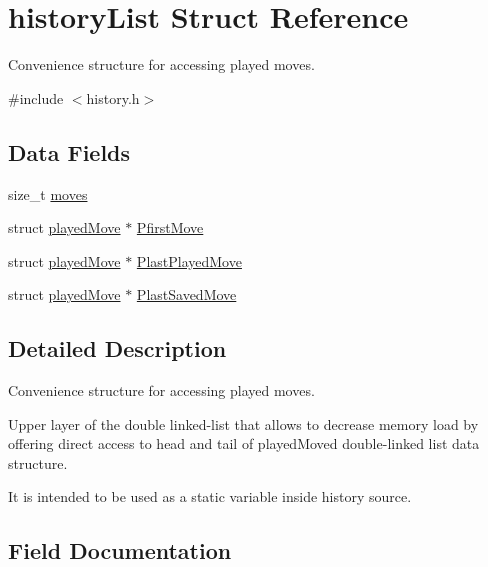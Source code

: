 \hypertarget{structhistory_list}{}\section{history\+List Struct Reference}
\label{structhistory_list}


Convenience structure for accessing played moves.  




{\ttfamily \#include $<$history.\+h$>$}

\subsection*{Data Fields}
\begin{DoxyCompactItemize}
\item 
size\+\_\+t \hyperlink{structhistory_list_aa8ce773e4eb2cb8a58847adeba38dd0b}{moves}
\item 
struct \hyperlink{structplayed_move}{played\+Move} $\ast$ \hyperlink{structhistory_list_a6c241bff39776a3474b353f7c95e26b7}{Pfirst\+Move}
\item 
struct \hyperlink{structplayed_move}{played\+Move} $\ast$ \hyperlink{structhistory_list_add21c432af64a474240b0dcbeb21478a}{Plast\+Played\+Move}
\item 
struct \hyperlink{structplayed_move}{played\+Move} $\ast$ \hyperlink{structhistory_list_a06eb9e37622d16b0dfbc2360be31334b}{Plast\+Saved\+Move}
\end{DoxyCompactItemize}


\subsection{Detailed Description}
Convenience structure for accessing played moves. 

Upper layer of the double linked-\/list that allows to decrease memory load by offering direct access to head and tail of played\+Moved double-\/linked list data structure.

It is intended to be used as a static variable inside history source. 

\subsection{Field Documentation}
\mbox{\label{structhistory_list_aa8ce773e4eb2cb8a58847adeba38dd0b}} 
